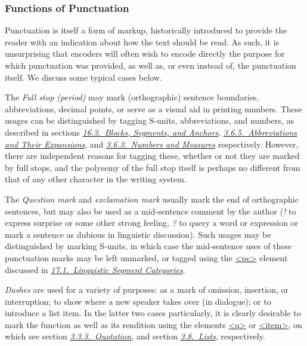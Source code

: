\subsubsection[{Functions of Punctuation}]{Functions of Punctuation}\label{COPU-1}\par
Punctuation is itself a form of markup, historically introduced to provide the reader with an indication about how the text should be read. As such, it is unsurprising that encoders will often wish to encode directly the purpose for which punctuation was provided, as well as, or even instead of, the punctuation itself. We discuss some typical cases below.\par
The \textit{Full stop (period)} may mark (orthographic) sentence boundaries, abbreviations, decimal points, or serve as a visual aid in printing numbers. These usages can be distinguished by tagging S-units, abbreviations, and numbers, as described in sections \textit{\hyperref[SASE]{16.3.\ Blocks, Segments, and Anchors}}, \textit{\hyperref[CONAAB]{3.6.5.\ Abbreviations and Their Expansions}}, and \textit{\hyperref[CONANU]{3.6.3.\ Numbers and Measures}} respectively. However, there are independent reasons for tagging these, whether or not they are marked by full stops, and the polysemy of the full stop itself is perhaps no different from that of any other character in the writing system.\par
The \textit{Question mark} and \textit{exclamation mark} usually mark the end of orthographic sentences, but may also be used as a mid-sentence comment by the author (\textit{!} to express surprise or some other strong feeling, \textit{?} to query a word or expression or mark a sentence as dubious in linguistic discussion). Such usages may be distinguished by marking S-units, in which case the mid-sentence uses of these punctuation marks may be left unmarked, or tagged using the \hyperref[TEI.pc]{<pc>} element discussed in \textit{\hyperref[AILC]{17.1.\ Linguistic Segment Categories}}.\par
\textit{Dashes} are used for a variety of purposes: as a mark of omission, insertion, or interruption; to show where a new speaker takes over (in dialogue); or to introduce a list item. In the latter two cases particularly, it is clearly desirable to mark the function as well as its rendition using the elements \hyperref[TEI.q]{<q>} or \hyperref[TEI.item]{<item>}, on which see section \textit{\hyperref[COHQQ]{3.3.3.\ Quotation}}, and section \textit{\hyperref[COLI]{3.8.\ Lists}}, respectively.\par
